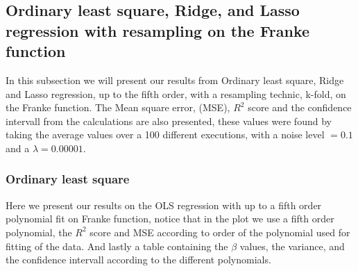 
\subsection{Ordinary least square, Ridge, and Lasso regression with resampling on the Franke function}

In this subsection we will present our results from Ordinary least square, Ridge and Lasso regression, up to the fifth order, with a resampling technic, k-fold, on the Franke function. The Mean square error, (MSE), $R^2$ score and the confidence intervall from the calculations are also presented, these values were found by taking the average values over a 100 different executions, with a noise level $= 0.1$ and a $\lambda = 0.00001$.


\subsubsection{Ordinary least square}
Here we present our results on the OLS regression with up to a fifth order polynomial fit on Franke function, notice that in the plot we use a fifth order polynomial, the $R^2$ score and MSE according to order of the polynomial used for fitting of the data. And lastly a table containing the $\beta$ values, the variance, and the confidence intervall according to the different polynomials.



